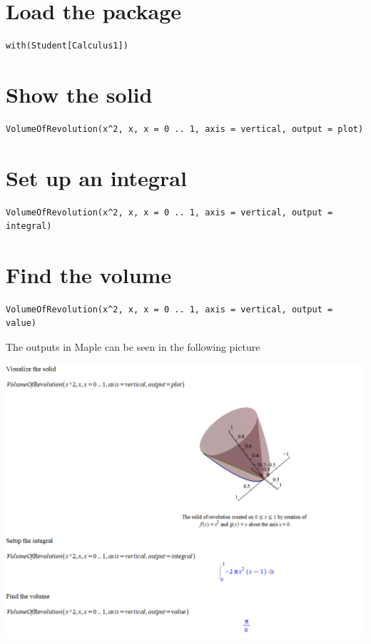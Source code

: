 \documentclass[]{book}
\theoremstyle{definition}
\theoremstyle{definition}
\theoremstyle{definition}
\theoremstyle{remark}
\let\BeginKnitrBlock\begin \let\EndKnitrBlock\end
\begin{document}
\BeginKnitrBlock{solution}
{}

\chapter{Load the package}\label{load-the-package}

\begin{verbatim}
with(Student[Calculus1])
\end{verbatim}

\chapter{Show the solid}\label{show-the-solid}

\begin{verbatim}
VolumeOfRevolution(x^2, x, x = 0 .. 1, axis = vertical, output = plot)
\end{verbatim}

\chapter{Set up an integral}\label{set-up-an-integral}

\begin{verbatim}
VolumeOfRevolution(x^2, x, x = 0 .. 1, axis = vertical, output = integral)
\end{verbatim}

\chapter{Find the volume}\label{find-the-volume}

\begin{verbatim}
VolumeOfRevolution(x^2, x, x = 0 .. 1, axis = vertical, output = value)
\end{verbatim}

The outputs in Maple can be seen in the following picture

\includegraphics{figs/VolOfRev-Example1.png}
\EndKnitrBlock{solution}
\end{document}
